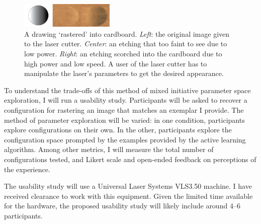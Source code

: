\begin{figure}
  \centering
  \includegraphics[width=0.4\textwidth]{figures/rasters}
  \caption{%
  A drawing `rastered' into cardboard.
  \emph{Left}: the original image given to the laser cutter.
  \emph{Center}: an etching that too faint to see due to low power.
  \emph{Right}: an etching scorched into the cardboard due to high power and low speed.
  A user of the laser cutter has to manipulate the laser's parameters to get the desired appearance.}
\label{fig:rasters}
\end{figure}

To understand the trade-offs of this method of mixed initiative parameter space exploration, I will run a usability study.
Participants will be asked to recover a configuration for rastering an image that matches an exemplar I provide.
The method of parameter exploration will be varied:
in one condition, participants explore configurations on their own.
In the other, participants explore the configuration space prompted by the examples provided by the active learning algorithm.
Among other metrics, I will measure the total number of configurations tested, and Likert scale and open-ended feedback on perceptions of the experience.

The usability study will use a Universal Laser Systems VLS3.50 machine.
I have received clearance to work with this equipment.
Given the limited time available for the hardware, the proposed usability study will likely include around 4--6 participants.
